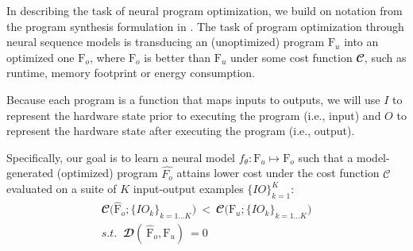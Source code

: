 \documentclass{article}
\begin{document}
In describing the task of neural program optimization, we build on notation from the program synthesis formulation in \cite{bunel2018leveraging} . The task of program optimization through neural sequence models 
is transducing an (unoptimized) program $\text{F}_u$ into an optimized one $\text{F}_o$, where $\text{F}_o$ is better than $\text{F}_u$ under some cost function $\mathbfcal{C}$, such as runtime, memory footprint or energy consumption.

Because each program is a function that maps inputs to outputs, we will use $I$ to represent the hardware state prior to executing the program (i.e., input) and $O$ to represent the hardware state after executing the program (i.e., output).


Specifically, our goal is to learn a neural model $f_{\theta}: \text{F}_u \mapsto \text{F}_o$ such that a model-generated (optimized) program $\hat{F_o}$ attains lower cost under the cost function $\mathcal{C}$ evaluated on a suite of $K$ input-output examples $\{ IO \}_{k=1}^K$:
\begin{equation}
    \label{eqn:optimizaiton_goal}
    \begin{split}
        \mathbfcal{C} \Big(\hat{\textrm{F}}_{o}; \{IO_k\}_{k=1...K} \Big)  \ 
        < \ 
        \mathbfcal{C} \Big(\textrm{F}_{u}; \{IO_k\}_{k=1...K}\Big) \\
         s.t. \;\; \mathbfcal{D}( \ 
                        \hat{\textrm{F}}_{o}, \textrm{F}_{u} ) \ 
                        = 0  %
    \end{split}
\end{equation}
\end{document}
